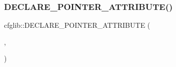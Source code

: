 \subsubsection{\texorpdfstring{D\+E\+C\+L\+A\+R\+E\+\_\+\+P\+O\+I\+N\+T\+E\+R\+\_\+\+A\+T\+T\+R\+I\+B\+U\+T\+E()}{DECLARE\_POINTER\_ATTRIBUTE()}\hspace{0.1cm}{\footnotesize\ttfamily [4/4]}}
{\footnotesize\ttfamily cfglib\+::\+D\+E\+C\+L\+A\+R\+E\+\_\+\+P\+O\+I\+N\+T\+E\+R\+\_\+\+A\+T\+T\+R\+I\+B\+U\+TE (\begin{DoxyParamCaption}\item[{\hyperlink{classcfglib_1_1Loop}{Loop}}]{,  }\item[{Serialisable\+Loop\+Attribute}]{ }\end{DoxyParamCaption})}

